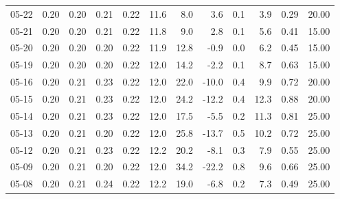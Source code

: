\begin{threeparttable}
{\begin{tabular}{lrrrrrrrrrrr}
  05-22 &          0.20 &          0.20 &          0.21 &        0.22 &                11.6 &                 8.0 &        3.6 &                 0.1 &              3.9 &            0.29 &                  20.00 \\
  05-21 &          0.20 &          0.20 &          0.21 &        0.22 &                11.8 &                 9.0 &        2.8 &                 0.1 &              5.6 &            0.41 &                  15.00 \\
  05-20 &          0.20 &          0.20 &          0.20 &        0.22 &                11.9 &                12.8 &       -0.9 &                 0.0 &              6.2 &            0.45 &                  15.00 \\
  05-19 &          0.20 &          0.20 &          0.20 &        0.22 &                12.0 &                14.2 &       -2.2 &                 0.1 &              8.7 &            0.63 &                  15.00 \\
  05-16 &          0.20 &          0.21 &          0.23 &        0.22 &                12.0 &                22.0 &      -10.0 &                 0.4 &              9.9 &            0.72 &                  20.00 \\
  05-15 &          0.20 &          0.21 &          0.23 &        0.22 &                12.0 &                24.2 &      -12.2 &                 0.4 &             12.3 &            0.88 &                  20.00 \\
  05-14 &          0.20 &          0.21 &          0.23 &        0.22 &                12.0 &                17.5 &       -5.5 &                 0.2 &             11.3 &            0.81 &                  25.00 \\
  05-13 &          0.20 &          0.21 &          0.20 &        0.22 &                12.0 &                25.8 &      -13.7 &                 0.5 &             10.2 &            0.72 &                  25.00 \\
  05-12 &          0.20 &          0.21 &          0.23 &        0.22 &                12.2 &                20.2 &       -8.1 &                 0.3 &              7.9 &            0.55 &                  25.00 \\
  05-09 &          0.20 &          0.21 &          0.20 &        0.22 &                12.0 &                34.2 &      -22.2 &                 0.8 &              9.6 &            0.66 &                  25.00 \\
  05-08 &          0.20 &          0.21 &          0.24 &        0.22 &                12.2 &                19.0 &       -6.8 &                 0.2 &              7.3 &            0.49 &                  25.00 \\

\end{tabular}}
\end{threeparttable}
